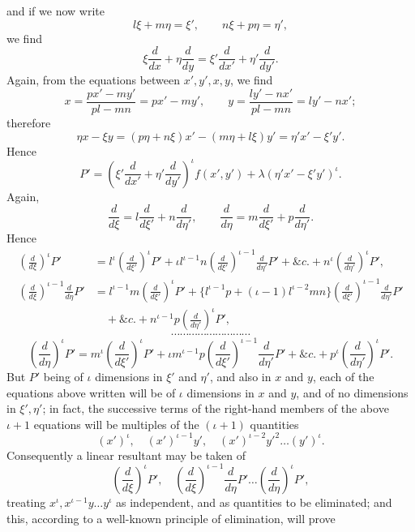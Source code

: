 \documentclass[11pt]{article}
\newcommand{\sourcepage}[1]{\marginpar{\scriptsize p.~#1}}
\begin{document}
{{\sourcepage{274}
and if we now write
\[
l\xi+m\eta=\xi',\qquad n\xi+p\eta=\eta',
\]
we find
\[
\xi\frac{d}{dx}+\eta\frac{d}{dy}
=\xi'\frac{d}{dx'}+\eta'\frac{d}{dy'}.
\]
Again, from the equations between $x',y',x,y$, we find
\[
x=\frac{px'-my'}{pl-mn}=px'-my',
\qquad
y=\frac{ly'-nx'}{pl-mn}=ly'-nx';
\]
therefore
\[
\eta x-\xi y=(p\eta+n\xi)x'-(m\eta+l\xi)y'=\eta'x'-\xi'y'.
\]
Hence
\[
P'=\left(\xi'\frac{d}{dx'}+\eta'\frac{d}{dy'}\right)^\iota f(x',y')+\lambda(\eta'x'-\xi'y')^\iota.
\]
Again,
\[
\frac{d}{d\xi}=l\frac{d}{d\xi'}+n\frac{d}{d\eta'},\qquad
\frac{d}{d\eta}=m\frac{d}{d\xi'}+p\frac{d}{d\eta'}.
\]
Hence
\[
\begin{aligned}
\left(\frac{d}{d\xi}\right)^\iota P'
&=l^\iota\left(\frac{d}{d\xi'}\right)^\iota P'
+\iota l^{\iota-1}n\left(\frac{d}{d\xi'}\right)^{\iota-1}\frac{d}{d\eta'}P'
+\&c.+n^\iota\left(\frac{d}{d\eta'}\right)^\iota P',\\
\left(\frac{d}{d\xi}\right)^{\iota-1}\frac{d}{d\eta}P'
&=l^{\iota-1}m\left(\frac{d}{d\xi'}\right)^\iota P'
+\{l^{\iota-1}p+(\iota-1)l^{\iota-2}mn\}
\left(\frac{d}{d\xi'}\right)^{\iota-1}\frac{d}{d\eta'}P'\\
&\quad+\&c.
+n^{\iota-1}p\left(\frac{d}{d\eta'}\right)^\iota P',
\end{aligned}
\]
\[
\cdots\cdots\cdots\cdots\cdots\cdots\cdots\cdots\cdots
\]
\[
\left(\frac{d}{d\eta}\right)^\iota P'
=m^\iota\left(\frac{d}{d\xi'}\right)^\iota P'
+\iota m^{\iota-1}p\left(\frac{d}{d\xi'}\right)^{\iota-1}\frac{d}{d\eta'}P'
+\&c.+p^\iota\left(\frac{d}{d\eta'}\right)^\iota P'.
\]
But $P'$ being of $\iota$ dimensions in $\xi'$ and $\eta'$, and also in $x$ and $y$, each of the equations above written will be of $\iota$ dimensions in $x$ and $y$, and of no dimensions in $\xi',\eta'$; in fact, the successive terms of the right-hand members of the above $\iota+1$ equations will be multiples of the $(\iota+1)$ quantities
\[
(x')^\iota,\quad (x')^{\iota-1}y',\quad (x')^{\iota-2}y'^2\ldots (y')^\iota.
\]
Consequently a linear resultant may be taken of
\[
\left(\frac{d}{d\xi}\right)^\iota P',\quad
\left(\frac{d}{d\xi}\right)^{\iota-1}\frac{d}{d\eta}P'\ldots
\left(\frac{d}{d\eta}\right)^\iota P',
\]
treating $x^\iota,x^{\iota-1}y\ldots y^\iota$ as independent, and as quantities to be eliminated; and this, according to a well-known principle of elimination, will prove

}}
\end{document}
